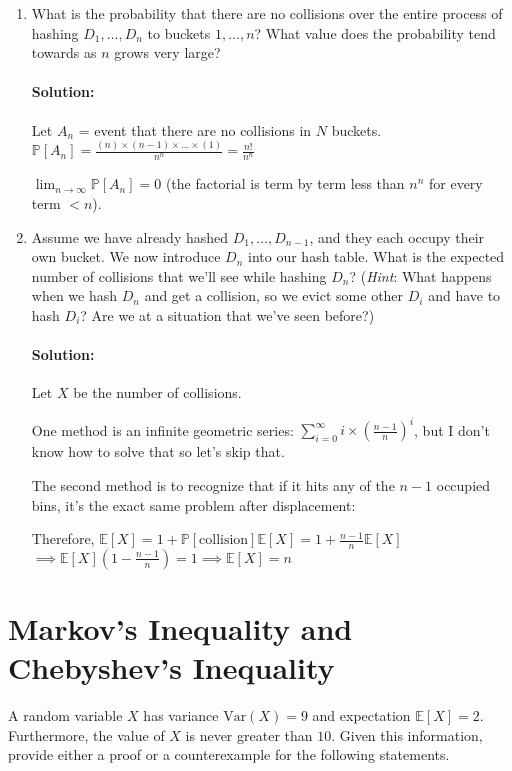 \documentclass[11pt, notitlepage]{article}
\newcommand{\E}{\mathbb{E}}
\newcommand{\mP}{\mathbb{P}}
\newcommand{\var}[1]{\text{Var}(#1)}
\newcommand{\Question}[1]{\newpage\section{#1}}
\newenvironment{solution}{\paragraph{Solution:}}{\hfill \vspace{10mm}}
\begin{document}
\begin{enumerate}[label=\alph*.)]
\item What is the probability that there are no collisions over the entire process of hashing $D_1, \ldots, D_n$ to buckets $1, \ldots, n$? What value does the probability tend towards as $n$ grows very large? 
\begin{solution}
	Let $A_n$ = event that there are no collisions in $N$ buckets. \\ $\mP[A_n]=\frac{(n) \times (n-1) \times \dots \times (1)}{n^n}=\frac{n!}{n^n}$
	
	$\lim_{n\rightarrow \infty} \mP[A_n] = 0$ (the factorial is term by term less than $n^n$ for every term $<n$).
\end{solution}
\item Assume we have already hashed $D_1, \ldots, D_{n - 1}$, and they each occupy their own bucket. We now introduce $D_n$ into our hash table. What is the expected number of collisions that we'll see while hashing $D_n$? (\emph{Hint}: What happens when we hash $D_n$ and get a collision, so we evict some other $D_i$ and have to hash $D_i$? Are we at a situation that we've seen before?)
\begin{solution}
	Let $X$ be the number of collisions.
	
	
	One method is an infinite geometric series:
	$\sum_{i=0}^{\infty}{i\times (\frac{n-1}{n})^i}$, but I don't know how to solve that so let's skip that.
	
	The second method is to recognize that if it hits any of the $n-1$ occupied bins, it's the exact same problem after displacement:
	
	Therefore, $\E[X] = 1 + \mP[\text{collision}]\E[X] = 1 + \frac{n-1}{n}\E[X]$
	$\implies \E[X] (1- \frac{n-1}{n})=1\implies\E[X]=n$
\end{solution}
\end{enumerate}



\Question{Markov's Inequality and Chebyshev's Inequality}

A random variable $X$ has variance $\var{X} = 9$ and expectation $\E[X]=2$. Furthermore, the value of $X$ is never greater than $10$. Given this information, provide either a proof or a counterexample for the following statements.
\end{document}
